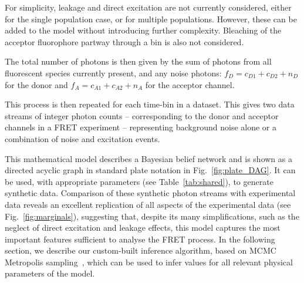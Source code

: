 For simplicity, leakage and direct excitation are not currently considered, either for the single population case, or for multiple populations. However, these can be added to the model without introducing further complexity. Bleaching of the acceptor fluorophore partway through a bin is also not considered. 

The total number of photons is then given by the sum of photons from all fluorescent species currently present, and any noise photons: $f_D = c_{D1}+c_{D2}+n_D$ for the donor and $f_A = c_{A1}+c_{A2} +n_A$ for the acceptor channel.     

This process is then repeated for each time-bin in a dataset. This gives two data streams of integer photon counts -- corresponding to the donor and acceptor channels in a FRET experiment -- representing background noise alone or a combination of noise and excitation events.

This mathematical model describes a Bayesian belief network and is shown as a directed acyclic graph in standard plate notation in Fig.~\ref{fig:plate_DAG}. It can be used, with appropriate parameters (see Table~\ref{tab:shared}), to generate synthetic data. Comparison of these synthetic photon streams with experimental data reveals an excellent replication of all aspects of the experimental data (see Fig.~\ref{fig:marginals}), suggesting that, despite its many simplifications, such as the neglect of direct excitation and leakage effects, this model captures the most important features sufficient to analyse the FRET process. In the following section, we describe our custom-built inference algorithm, based on MCMC Metropolis sampling~\cite{hastings70}, which can be used to infer values for all relevant physical parameters of the model.



